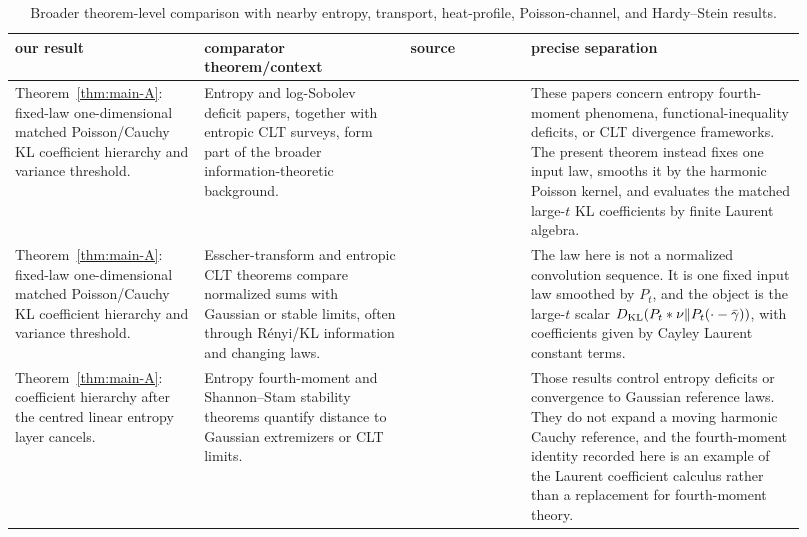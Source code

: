 {\scriptsize
\setlength{\tabcolsep}{3pt}
\renewcommand{\arraystretch}{1.18}
\begin{longtable}{>{\raggedright\arraybackslash}p{0.22\linewidth}|%
>{\raggedright\arraybackslash}p{0.24\linewidth}|%
>{\raggedright\arraybackslash}p{0.14\linewidth}|%
>{\raggedright\arraybackslash}p{0.32\linewidth}}
\caption{Broader theorem-level comparison with nearby entropy, transport,
heat-profile, Poisson-channel, and Hardy--Stein results.}
\label{tab:broader-related-work-comparison}\\
\textbf{our result}
& \textbf{comparator theorem/context}
& \textbf{source}
& \textbf{precise separation}\\
\hline
Theorem~\ref{thm:main-A}: fixed-law one-dimensional matched
Poisson/Cauchy KL coefficient hierarchy and variance threshold.
& Entropy and log-Sobolev deficit papers, together with entropic CLT surveys,
form part of the broader information-theoretic background.
& \cite{NourdinPeccatiSwan2014EntropyFourthMoment,
BobkovGozlanRobertoSamson2014LogSobolevDeficit,
BobkovGotzeRenyiSurvey2025}
& These papers concern entropy fourth-moment phenomena, functional-inequality
deficits, or CLT divergence frameworks.  The present theorem instead fixes
one input law, smooths it by the harmonic Poisson kernel, and evaluates the
matched large-\(t\) KL coefficients by finite Laurent algebra.\\
\hline
Theorem~\ref{thm:main-A}: fixed-law one-dimensional matched
Poisson/Cauchy KL coefficient hierarchy and variance threshold.
& Esscher-transform and entropic CLT theorems compare normalized sums with
Gaussian or stable limits, often through R{\'e}nyi/KL information and
changing laws.
& \cite{BobkovGotzeEsscher2025}
& The law here is not a normalized convolution sequence.  It is one fixed
input law smoothed by \(P_t\), and the object is the large-\(t\) scalar
\(D_{\rm KL}(P_t*\nu\|P_t(\cdot-\bar\gamma))\), with coefficients given by
Cayley Laurent constant terms.\\
\hline
Theorem~\ref{thm:main-A}: coefficient hierarchy after the centred linear
entropy layer cancels.
& Entropy fourth-moment and Shannon--Stam stability theorems quantify
distance to Gaussian extremizers or CLT limits.
& \cite{NourdinPeccatiSwan2014EntropyFourthMoment,
EldanMikulincer2020ShannonStam,ArtsteinBallBartheNaor2004}
& Those results control entropy deficits or convergence to Gaussian
reference laws.  They do not expand a moving harmonic Cauchy reference, and
the fourth-moment identity recorded here is an example of the Laurent
coefficient calculus rather than a replacement for fourth-moment theory.\\

\end{longtable}}

